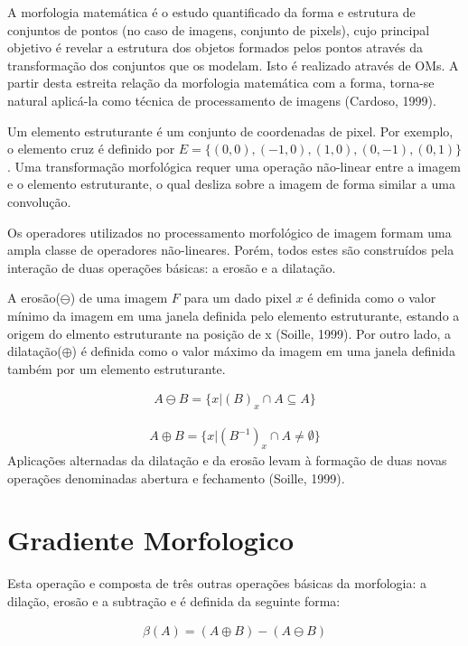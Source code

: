 \documentclass[
	article,			%
	11pt,				%
	oneside,			%
	a4paper,			%
	english,			%
	brazil,				%
	sumario=tradicional
	]{abntex2}
\begin{document}
A morfologia matemática é o estudo quantificado da forma e estrutura de
conjuntos de pontos (no caso de imagens, conjunto de pixels), cujo principal
objetivo é revelar a estrutura dos objetos formados pelos pontos através da
transformação dos conjuntos que os modelam. Isto é realizado através de OMs. A
partir desta estreita relação da morfologia matemática com a forma, torna-se
natural aplicá-la como técnica de processamento de imagens (Cardoso, 1999).

   Um elemento estruturante é um conjunto de coordenadas de pixel. Por exemplo,
o elemento cruz é definido por $E=\{(0,0),(-1,0),(1,0),(0,-1),(0,1)\}$.
Uma transformação morfológica requer uma operação não-linear entre a imagem e o
elemento estruturante, o qual desliza sobre a imagem de forma similar a uma
convolução.

Os operadores utilizados no processamento morfológico de imagem formam uma ampla
classe de operadores não-lineares. Porém, todos estes são construídos pela
interação de duas operações básicas: a erosão e a dilatação.

A erosão($\ominus$) de uma imagem $F$ para um dado pixel $x$ é definida como o
valor mínimo da imagem em uma janela definida pelo elemento estruturante, estando a origem do
elmento estruturante na posição de x (Soille, 1999). Por outro lado, a
dilatação($\oplus$) é definida como o valor máximo da imagem em uma janela
definida também por um elemento estruturante.


\begin{align}
A \ominus B = \{x | ( B )_x \cap A \subseteq  A\}
\end{align}

\begin{align}
A \oplus B = \{x | (  B^{-1} )_x \cap A \neq  \emptyset\}
\end{align}
Aplicações alternadas da dilatação e da erosão levam à formação de duas novas
operações denominadas abertura e fechamento (Soille, 1999).

\section{Gradiente Morfologico}
Esta operação e composta de três outras operações básicas da morfologia: a
dilação, erosão e a subtração e é definida da seguinte forma:

\begin{align}
\beta(A) = (A \oplus B) - (A \ominus B)
\end{align}
\end{document}
